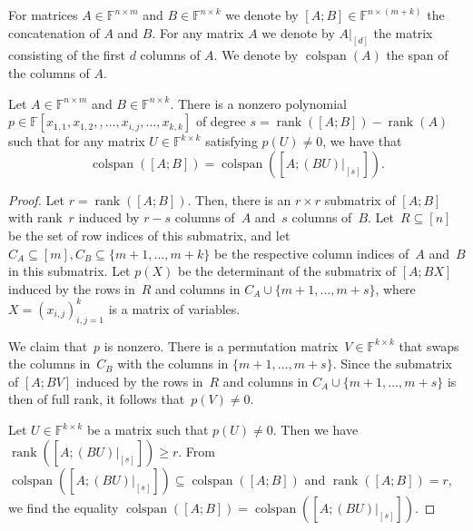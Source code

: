 \documentclass[11pt]{article}
\newcommand{\FF}{\mathbb{F}}
\DeclareMathOperator{\rank}{rank} \DeclareMathOperator{\col}{colspan}
\begin{document}
For matrices $A \in \FF^{n\times m}$ and $B \in \FF^{n \times k}$ we denote by $[A; B] \in \FF^{n \times (m+k)}$ the concatenation of $A$ and $B$. For any matrix $A$ we denote by $A|_{[d]}$ the matrix consisting of the first $d$ columns of $A$. We denote by $\col(A)$ the span of the columns of $A$.

\begin{lemma}\label{lem:colspan}
    Let $A \in \FF^{n\times m}$ and $B \in \FF^{n \times k}$. There is a nonzero %
    polynomial $p\in \FF[x_{1,1},x_{1,2},,\ldots,x_{i,j},\dots,x_{k,k}]$ of degree $s = \rank([A;B]) - \rank(A)$ such that for any matrix $U \in \FF^{k\times k}$ satisfying $p(U)\neq 0$, we have that
    \[
    \col([A;B]) = \col([A; (BU)|_{[s]}]).
    \]
\end{lemma}
\begin{proof}
    Let $r = \rank([A;B])$. Then, there is an $r\times r$ submatrix of $[A;B]$ with rank~$r$ induced by $r-s$ columns of~$A$ and~$s$ columns of~$B$.
    Let~$R\subseteq [n]$ be the set of row indices of this submatrix, and let $C_A\subseteq[m], C_B\subseteq \{m+1,\dots,m+k\}$ be the respective column indices of~$A$ and~$B$ in this submatrix.
    Let $p(X)$ be the determinant of the submatrix of $[A;BX]$ induced by the rows in~$R$ and columns in $C_A\cup \{m+1,\dots,m+s\}$, where $X = (x_{i,j})_{i,j=1}^k$ is a matrix of variables.
    
    We claim that~$p$ is nonzero. There is a permutation matrix~$V\in \FF^{k \times k}$ that swaps the columns in~$C_B$ with the columns in $\{m+1,\dots, m+s\}$. Since the submatrix of $[A;BV]$ induced by the rows in~$R$ and columns in $C_A\cup \{m+1,\dots,m+s\}$ is then of full rank, it follows that~$p(V)\ne 0$. 
        
    Let $U \in \FF^{k \times k}$ be a matrix such that $p(U) \neq 0$. 
    Then we have $\rank([A; (BU)|_{[s]}]) \geq r$. From $\col([A; (BU)|_{[s]}])\subseteq \col([A;B])$ and $\rank([A;B]) = r$, we find the equality $\col([A;B]) = \col([A; (BU)|_{[s]}])$.
\end{proof}


\end{document}
